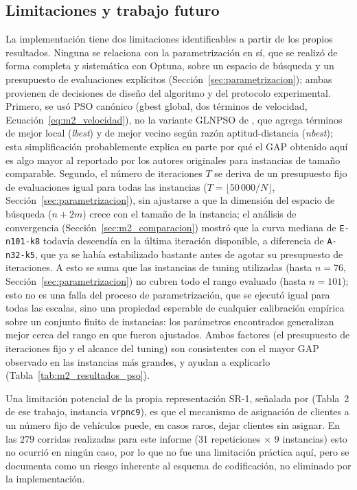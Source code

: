 \subsection{Limitaciones y trabajo futuro}
\label{sec:m2_limitaciones}

La implementación tiene dos limitaciones identificables a partir de los propios
resultados. Ninguna se relaciona con la parametrización en sí, que se realizó de forma
completa y sistemática con Optuna, sobre un espacio de búsqueda y un presupuesto de
evaluaciones explícitos (Sección~\ref{sec:parametrizacion}); ambas provienen de
decisiones de diseño del algoritmo y del protocolo experimental. Primero, se usó PSO
canónico (gbest global, dos términos de velocidad, Ecuación~\ref{eq:m2_velocidad}),
no la variante GLNPSO de \textcite{ai2009particle}, que agrega términos de mejor local
(\textit{lbest}) y de mejor vecino según razón aptitud-distancia (\textit{nbest}); esta
simplificación probablemente explica en parte por qué el GAP obtenido aquí es algo mayor
al reportado por los autores originales para instancias de tamaño comparable. Segundo,
el número de iteraciones $T$ se deriva de un presupuesto fijo de evaluaciones igual para
todas las instancias ($T=\lfloor 50\,000/N\rfloor$, Sección~\ref{sec:parametrizacion}),
sin ajustarse a que la dimensión del espacio de búsqueda ($n+2m$) crece con el tamaño de
la instancia; el análisis de convergencia (Sección~\ref{sec:m2_comparacion}) mostró que
la curva mediana de \texttt{E-n101-k8} todavía descendía en la última iteración
disponible, a diferencia de \texttt{A-n32-k5}, que ya se había estabilizado bastante
antes de agotar su presupuesto de iteraciones. A esto se suma que las instancias de
tuning utilizadas (hasta $n=76$, Sección~\ref{sec:parametrizacion}) no cubren todo el
rango evaluado (hasta $n=101$); esto no es una falla del proceso de parametrización, que
se ejecutó igual para todas las escalas, sino una propiedad esperable de cualquier
calibración empírica sobre un conjunto finito de instancias: los parámetros encontrados
generalizan mejor cerca del rango en que fueron ajustados. Ambos factores (el presupuesto
de iteraciones fijo y el alcance del tuning) son consistentes con el mayor GAP observado
en las instancias más grandes, y ayudan a explicarlo (Tabla~\ref{tab:m2_resultados_pso}).

Una limitación potencial de la propia representación SR-1, señalada por
\textcite{ai2009particle} (Tabla~2 de ese trabajo, instancia \texttt{vrpnc9}), es que el
mecanismo de asignación de clientes a un número fijo de vehículos puede, en casos raros,
dejar clientes sin asignar. En las $279$ corridas realizadas para este informe (31
repeticiones $\times$ 9 instancias) esto no ocurrió en ningún caso, por lo que no fue una
limitación práctica aquí, pero se documenta como un riesgo inherente al esquema de
codificación, no eliminado por la implementación.

